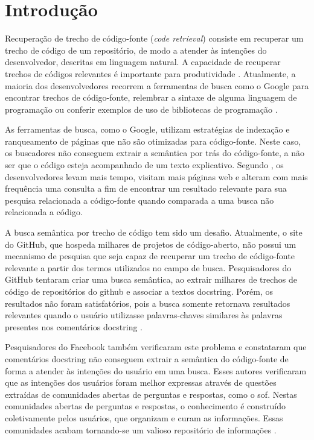 \chapter{Introdução}
\label{cap:introducao}


Recuperação de trecho de código-fonte (\textit{code retrieval}) consiste em recuperar um trecho de código de um repositório, de modo a atender às intenções do desenvolvedor, descritas em linguagem natural. A capacidade de recuperar trechos de códigos relevantes é importante para produtividade \citep{sadowski-how-developers-search-for-code-case-study:2015}. Atualmente, a maioria dos desenvolvedores recorrem a ferramentas de busca como o Google para encontrar trechos de código-fonte, relembrar a sintaxe de alguma linguagem de programação ou conferir exemplos de uso de bibliotecas de programação \citep{masudur-developers-use-google-code-retrieval:2018}.

As ferramentas de busca, como o Google, utilizam estratégias de indexação e ranqueamento de páginas que não são otimizadas para código-fonte. Neste caso, os buscadores não conseguem extrair a semântica por trás do código-fonte, a não ser que o código esteja acompanhado de um texto explicativo. Segundo \cite{masudur-developers-use-google-code-retrieval:2018}, os desenvolvedores levam mais tempo, visitam mais páginas web e alteram com mais frequência uma consulta a fim de encontrar um resultado relevante para sua pesquisa relacionada a código-fonte quando comparada a uma busca não relacionada a código.


A busca semântica por trecho de código tem sido um desafio. Atualmente, o site do GitHub, que hospeda milhares de projetos de código-aberto, não possui um mecanismo de pesquisa que
seja capaz de recuperar um trecho de código-fonte relevante a partir dos termos utilizados no campo de busca. Pesquisadores do GitHub tentaram criar uma busca semântica, ao extrair milhares de trechos de código de repositórios do \Gls{github} e associar a textos \gls{docstring}. Porém, os resultados não foram satisfatórios, pois a busca somente retornava resultados relevantes quando o usuário utilizasse palavras-chaves similares às palavras presentes nos comentários \gls{docstring} \citep{husain-github-semantic-search-code-2019}. 

Pesquisadores do Facebook \citep{cambronero-deep-learning-code-search:2019} também verificaram este problema e constataram que comentários \gls{docstring} não conseguem extrair a semântica do código-fonte de forma a atender às intenções do usuário em uma busca. Esses autores verificaram que as intenções dos usuários foram melhor expressas através de questões extraídas de comunidades abertas de perguntas e respostas, como o \gls{sof}. Nestas comunidades abertas de perguntas e respostas, o conhecimento é construído coletivamente pelos usuários, que organizam e curam as informações. Essas comunidades acabam tornando-se um valioso repositório de informações \citep{Wang-quora:2013}. 

